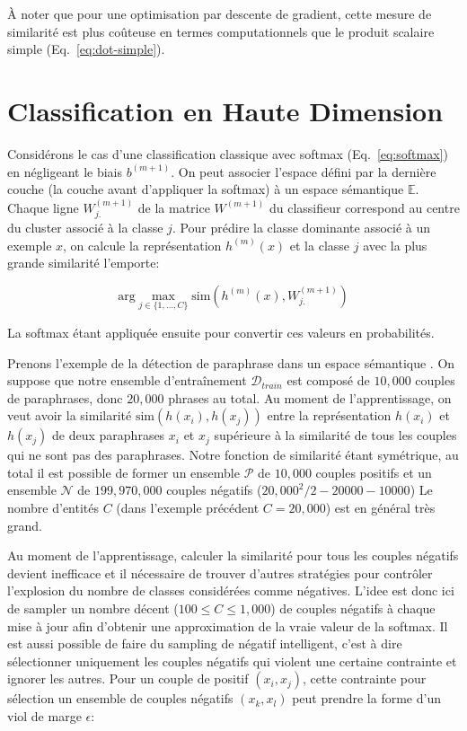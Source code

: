 À noter que pour une optimisation par descente de gradient, cette mesure de
similarité est plus coûteuse en termes computationnels que le produit scalaire
simple (Eq.~\ref{eq:dot-simple}).

\section{Classification en Haute Dimension}
\label{sec:chd}

Considérons le cas d'une classification classique avec softmax
(Eq.~\ref{eq:softmax}) en négligeant le biais $b^{(m+1)}$. On peut associer
l'espace défini par la dernière couche (la couche avant d'appliquer la softmax)
à un espace sémantique $\mathbb{E}$.  Chaque ligne $W^{(m+1)}_{j.}$ de la
matrice $W^{(m+1)}$ du classifieur correspond au centre du cluster associé à
la classe $j$. Pour prédire la classe dominante associé à un exemple $x$, on
calcule la représentation $h^{(m)}(x)$ et la classe $j$ avec la plus grande
similarité l'emporte:

\begin{equation}
\textrm{arg}\max_{j\in\lbrace 1,\dots ,C\rbrace} \textrm{sim}(h^{(m)}(x), W^{(m+1)}_{j.})
\end{equation}

La softmax étant appliquée ensuite pour convertir ces valeurs en probabilités.

Prenons l'exemple de la détection de paraphrase dans un espace sémantique
\citep{msr-paraphrase}. On suppose que notre ensemble d'entraînement
$\mathcal{D}_{train}$ est composé de $10,000$ couples de paraphrases, donc
$20,000$ phrases au total. Au moment de l'apprentissage, on veut avoir la similarité
$\textrm{sim}(h(x_i),h(x_j))$ entre la représentation $h(x_i)$ et $h(x_j)$ de
deux paraphrases $x_i$ et $x_j$ supérieure à la similarité de tous les couples
qui ne sont pas des paraphrases. Notre fonction de similarité étant symétrique,
au total il est possible de former un ensemble $\mathcal{P}$ de $10,000$
couples positifs et un ensemble $\mathcal{N}$ de $199,970,000$ couples négatifs
($20,000^2/2 - 20000 - 10000$) Le nombre d'entités $C$ (dans l'exemple
précédent $C=20,000$) est en général très grand.

Au moment de l'apprentissage, calculer la similarité pour tous les couples
négatifs devient inefficace et il nécessaire de trouver d'autres stratégies
pour contrôler l'explosion du nombre de classes considérées comme négatives.
L'idee est donc ici de sampler un nombre décent ($100\leq C\leq 1,000$) de couples négatifs à chaque
mise à jour afin d'obtenir une approximation de la vraie valeur de la softmax.
Il est aussi possible de faire du sampling de négatif intelligent, c'est à dire
sélectionner uniquement les couples négatifs qui violent une certaine
contrainte et ignorer les autres. Pour un couple de positif $(x_i, x_j)$, cette
contrainte pour sélection un ensemble de couples négatifs $(x_k, x_l)$ peut
prendre la forme d'un viol de marge $\epsilon$:

